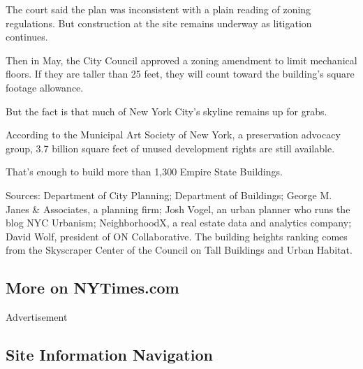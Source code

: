 The court said the plan was inconsistent with a plain reading of zoning
regulations. But construction at the site remains underway as litigation
continues.

Then in May, the City Council approved a zoning amendment to limit
mechanical floors. If they are taller than 25 feet, they will count
toward the building's square footage allowance.

But the fact is that much of New York City's skyline remains up for
grabs.

According to the Municipal Art Society of New York, a preservation
advocacy group, 3.7 billion square feet of unused development rights are
still available.

That's enough to build more than 1,300 Empire State Buildings.

Sources: Department of City Planning; Department of Buildings; George M.
Janes \& Associates, a planning firm; Josh Vogel, an urban planner who
runs the blog NYC Urbanism; NeighborhoodX, a real estate data and
analytics company; David Wolf, president of ON Collaborative. The
building heights ranking comes from the Skyscraper Center of the Council
on Tall Buildings and Urban Habitat.

\hypertarget{more-on-nytimescom}{%
\subsection{More on NYTimes.com}\label{more-on-nytimescom}}

Advertisement

\hypertarget{site-information-navigation}{%
\subsection{Site Information
Navigation}\label{site-information-navigation}}

